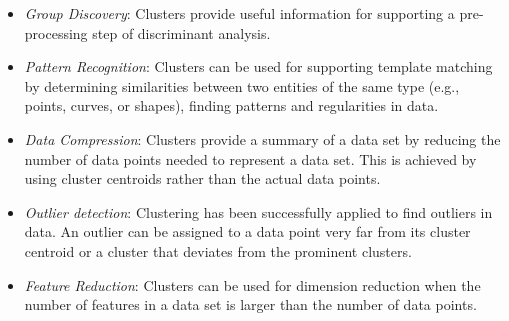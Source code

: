 \begin{itemize}
    \item \textit{Group Discovery}: Clusters provide useful information for supporting a pre-processing step of discriminant analysis. 
    \item \textit{Pattern Recognition}: Clusters can be used for supporting template matching by determining similarities between two entities of the same type (e.g., points, curves, or shapes), finding patterns and regularities in data.
    
    \item \textit{Data Compression}: Clusters provide a summary of a data set by reducing the number of data points needed to represent a data set. This is achieved by using cluster centroids rather than the actual data points. 
    
    \item \textit{Outlier detection}: Clustering has been successfully applied to find outliers in data. %
    An outlier can be assigned to a data point very far from its cluster centroid or a cluster that deviates from the prominent clusters.
    \item \textit{Feature Reduction}: Clusters can be used for dimension reduction when the number of features in a data set is larger than the number of data points.
    \end{itemize}













